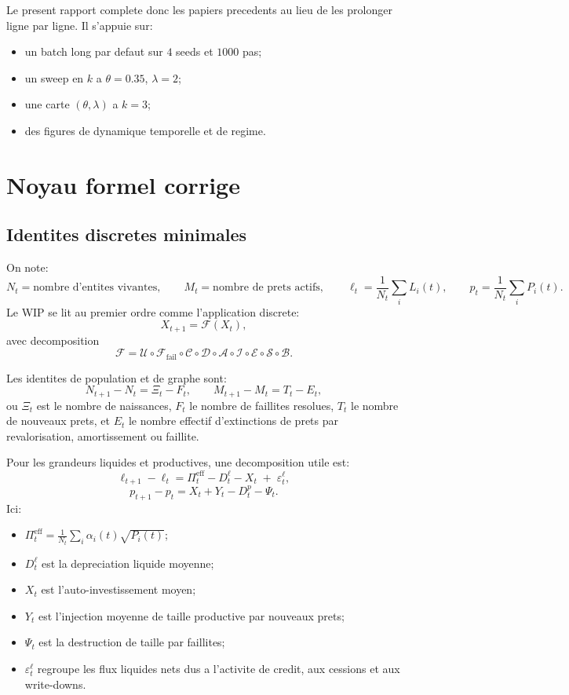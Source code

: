 \documentclass[11pt,a4paper]{article}
\begin{document}
Le present rapport complete donc les papiers precedents au lieu de les prolonger ligne par ligne. Il s'appuie sur:
\begin{itemize}
\item un batch long par defaut sur $4$ seeds et $1000$ pas;
\item un sweep en $k$ a $\theta=0.35$, $\lambda=2$;
\item une carte $(\theta,\lambda)$ a $k=3$;
\item des figures de dynamique temporelle et de regime.
\end{itemize}

\section{Noyau formel corrige}
\subsection{Identites discretes minimales}
On note:
\[
N_t = \text{nombre d'entites vivantes},\qquad
M_t = \text{nombre de prets actifs},\qquad
\ell_t = \frac{1}{N_t}\sum_i L_i(t),\qquad
p_t = \frac{1}{N_t}\sum_i P_i(t).
\]
Le WIP se lit au premier ordre comme l'application discrete:
\[
X_{t+1} = \mathcal F(X_t),
\]
avec decomposition
\[
\mathcal F=
\mathcal U \circ
\mathcal F_{\mathrm{fail}} \circ
\mathcal C \circ
\mathcal D \circ
\mathcal A \circ
\mathcal I \circ
\mathcal E \circ
\mathcal S \circ
\mathcal B.
\]

Les identites de population et de graphe sont:
\[
N_{t+1}-N_t = \Xi_t - F_t,
\qquad
M_{t+1}-M_t = T_t - E_t,
\]
ou $\Xi_t$ est le nombre de naissances, $F_t$ le nombre de faillites resolues, $T_t$ le nombre de nouveaux prets, et $E_t$ le nombre effectif d'extinctions de prets par revalorisation, amortissement ou faillite.

Pour les grandeurs liquides et productives, une decomposition utile est:
\[
\ell_{t+1}-\ell_t
=
\Pi^{\mathrm{eff}}_t
-D^\ell_t
-X_t
\;+\;
\varepsilon^\ell_t,
\]
\[
p_{t+1}-p_t
=
X_t
+Y_t
-D^p_t
-\Psi_t.
\]
Ici:
\begin{itemize}
\item $\Pi^{\mathrm{eff}}_t=\frac{1}{N_t}\sum_i \alpha_i(t)\sqrt{P_i(t)}$;
\item $D^\ell_t$ est la depreciation liquide moyenne;
\item $X_t$ est l'auto-investissement moyen;
\item $Y_t$ est l'injection moyenne de taille productive par nouveaux prets;
\item $\Psi_t$ est la destruction de taille par faillites;
\item $\varepsilon^\ell_t$ regroupe les flux liquides nets dus a l'activite de credit, aux cessions et aux write-downs.
\end{itemize}
\end{document}
